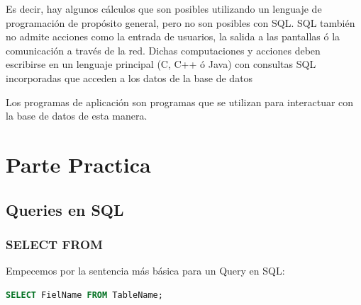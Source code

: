 \documentclass[12pt, fleqn]{report}                             %
\begin{document}
            Es decir, hay algunos cálculos que son posibles utilizando un lenguaje de programación
            de propósito general, pero no son posibles con SQL.
            SQL también no admite acciones como la entrada de usuarios, la salida a las pantallas 
            ó la comunicación a través de la red.
            Dichas computaciones y acciones deben escribirse en un lenguaje principal (C, C++ ó Java)
            con consultas SQL incorporadas que acceden a los datos de la base de datos

            Los programas de aplicación son programas que se utilizan para interactuar con la base de datos de esta manera.








\part{Parte Practica}
\clearpage


    \chapter{Queries en SQL}
    \clearpage

        \section{SELECT FROM}

            Empecemos por la sentencia más básica para un Query en SQL:

            \begin{lstlisting}[language=SQL, gobble=16]
                SELECT FielName FROM TableName;
            \end{lstlisting}
\end{document}
